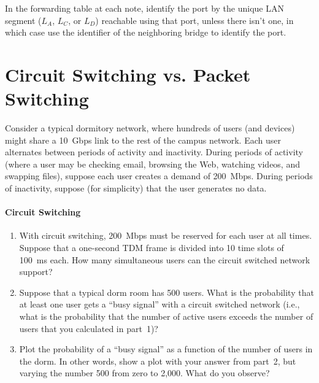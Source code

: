 \documentclass[11pt]{article}
\begin{document}
In the forwarding table at each note, identify the port by the unique
LAN segment ($L_A$, $L_C$, or $L_D$) reachable using that port, unless
there isn't one, in which case use the identifier of the neighboring
bridge to identify the port.

\newpage

\section{Circuit Switching vs. Packet Switching}

Consider a typical dormitory network, where hundreds of users (and
devices) might share a 10~Gbps link to the rest of the campus network.
Each user alternates between periods of activity and inactivity.  During
periods of activity (where a user may be checking email, browsing the
Web, watching videos, and swapping files), suppose each user creates a
demand of 200~Mbps.  During periods of inactivity, suppose (for
simplicity) that the user generates no data.

\paragraph{Circuit Switching}
\begin{enumerate}
\item With circuit switching, 200~Mbps must be reserved for each user at
  all times.  Suppose that a one-second TDM frame is divided into 10
  time slots of 100~ms each.  How many simultaneous users can the
  circuit switched network support?
\item Suppose that a typical dorm room has 500 users.  What is the
  probability that at least one user gets a ``busy signal'' with a
  circuit switched network (i.e., what is the probability that the
  number of active users exceeds the number of users that you calculated
  in part~1)?
\item Plot the probability of a ``busy signal'' as a function of the
  number of users in the dorm.  In other words, show a plot with your
  answer from part~2, but varying the number 500 from zero to
  2,000. What do you observe?
\end{enumerate}
\end{document}
